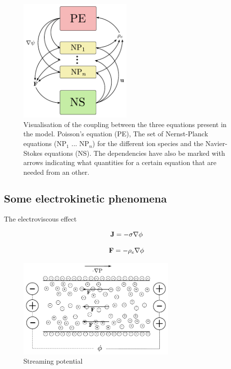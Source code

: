 \begin{frame}
\begin{figure}
\begin{center}
\includegraphics[width=0.5\textwidth]{../fig/coupling.pdf}
\end{center}
\caption{Visualisation of the coupling between the three equations
  present in the model. Poisson's equation (PE), The set of
  Nernst-Planck equations (NP$_1$ ... NP$_n$) for the different ion
  species and the Navier-Stokes equations (NS). The dependencies have
  also be marked with arrows indicating what quantities for a certain
  equation that are needed from an other.}
\label{fig:coupling}
\end{figure}
\end{frame}

\subsection{Some electrokinetic phenomena}

\begin{frame}{The electroviscous effect}

\begin{equation}
\mathbf{J} = -  \sigma \nabla \phi  
\end{equation}

\begin{equation}
\mathbf{F} = - \rho_e \nabla \phi
\end{equation}

\begin{figure}
\begin{center}
\includegraphics[width=0.7\textwidth]{../fig/channel_electroviscous.pdf}\\
Streaming potential
\end{center}
\end{figure}

\end{frame}

